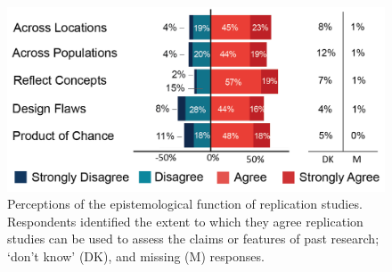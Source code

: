 \documentclass[]{interact}
\theoremstyle{plain}%
\theoremstyle{definition}
\theoremstyle{remark}
\begin{document}
\begin{figure}[hbt!]
    \centering
    \includegraphics[scale=1]{results/figures/Fig1-Q7-Epistemology.png}
    \caption{Perceptions of the epistemological function of replication studies. Respondents identified the extent to which they agree replication studies can be used to assess the claims or features of past research; `don't know' (DK), and missing (M) responses.}
    \label{fig:Q7-Epistemology}
\end{figure}

\newpage
\end{document}
